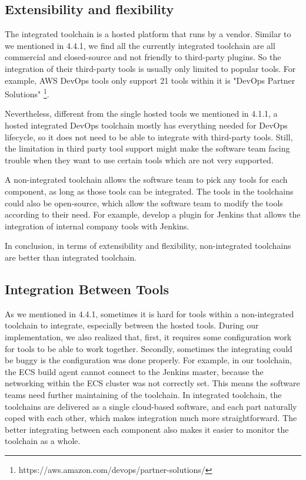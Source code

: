 \subsection{Extensibility and flexibility}
The integrated toolchain is a hosted platform that runs by a vendor. Similar to we mentioned in 4.4.1, we find all the currently integrated toolchain are all commercial and closed-source and not friendly to third-party plugins. So the integration of their third-party tools is usually only limited to popular tools. For example, AWS DevOps tools only support 21 tools within it is "DevOps Partner Solutions" \footnote{https://aws.amazon.com/devops/partner-solutions/}.
\par
Nevertheless, different from the single hosted tools we mentioned in 4.1.1, a hosted integrated DevOps toolchain mostly has everything needed for DevOps lifecycle, so it does not need to be able to integrate with third-party tools. Still, the limitation in third party tool support might make the software team facing trouble when they want to use certain tools which are not very supported.
\par
A non-integrated toolchain allows the software team to pick any tools for each component, as long as those tools can be integrated. The tools in the toolchains could also be open-source, which allow the software team to modify the tools according to their need. For example, develop a plugin for Jenkins that allows the integration of internal company tools with Jenkins.
\par
In conclusion, in terms of extensibility and flexibility, non-integrated toolchains are better than integrated toolchain.
\subsection{Integration Between Tools}
As we mentioned in 4.4.1, sometimes it is hard for tools within a non-integrated toolchain to integrate, especially between the hosted tools. 
During our implementation, we also realized that, first, it requires some configuration work for tools to be able to work together. Secondly, sometimes the integrating could be buggy is the configuration was done properly. For example, in our toolchain, the ECS build agent cannot connect to the Jenkins master, because the networking within the ECS cluster was not correctly set. This means the software teams need further maintaining of the toolchain.
In integrated toolchain, the toolchains are delivered as a single cloud-based software, and each part naturally coped with each other, which makes integration much more straightforward.
The better integrating between each component also makes it easier to monitor the toolchain as a whole.
